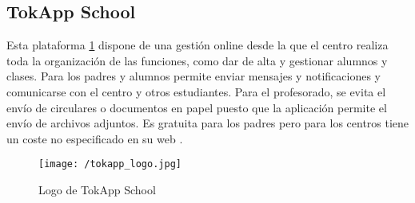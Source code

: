 \newpage

\subsection{TokApp School}
Esta plataforma \ref{fig:tokapp} dispone de una gestión online desde la que el centro realiza toda la organización de las funciones, como dar de alta y gestionar alumnos y clases. Para los padres y alumnos permite enviar mensajes y notificaciones y comunicarse con el centro y otros estudiantes. Para el profesorado, se evita el envío de circulares o documentos en papel puesto que la aplicación permite el envío de archivos adjuntos. Es gratuita para los padres pero para los centros tiene un coste no especificado en su web \cite{Educo2016}.

\begin{figure}[!h]
	\begin{center}
		\texttt{[image: /tokapp\_logo.jpg]}
		\caption{Logo de TokApp School}
		\label{fig:tokapp}
	\end{center}
\end{figure}

